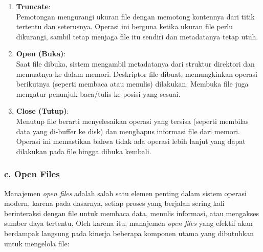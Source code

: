 \documentclass[12pt]{article}
\begin{document}
\begin{enumerate}
    \item \textbf{Truncate}: \\
    Pemotongan mengurangi ukuran file dengan memotong kontennya dari titik tertentu dan seterusnya. Operasi ini berguna ketika ukuran file perlu dikurangi, sambil tetap menjaga file itu sendiri dan metadatanya tetap utuh.
    
    \item \textbf{Open (Buka)}: \\
    Saat file dibuka, sistem mengambil metadatanya dari struktur direktori dan memuatnya ke dalam memori. Deskriptor file dibuat, memungkinkan operasi berikutnya (seperti membaca atau menulis) dilakukan. Membuka file juga mengatur penunjuk baca/tulis ke posisi yang sesuai.
    
    \item \textbf{Close (Tutup)}: \\
    Menutup file berarti menyelesaikan operasi yang tersisa (seperti membilas data yang di-buffer ke disk) dan menghapus informasi file dari memori. Operasi ini memastikan bahwa tidak ada operasi lebih lanjut yang dapat dilakukan pada file hingga dibuka kembali.
\end{enumerate}
\subsubsection*{c. Open Files}


Manajemen \textit{open files} adalah salah satu elemen penting dalam sistem operasi modern, karena pada dasarnya, setiap proses yang berjalan sering kali berinteraksi dengan file untuk membaca data, menulis informasi, atau mengakses sumber daya tertentu. Oleh karena itu, manajemen \textit{open files} yang efektif akan berdampak langsung pada kinerja beberapa komponen utama yang dibutuhkan untuk mengelola file:
\end{document}
